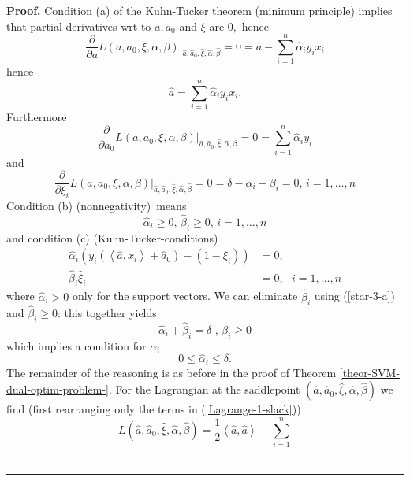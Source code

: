 \documentclass[11pt,twoside]{article}%
\theoremstyle{change}
\newenvironment{proof}[1][Proof]{\textbf{#1.} }{\ \rule{0.5em}{0.5em}}
\begin{document}
\begin{proof}
Condition (a) of the Kuhn-Tucker theorem (minimum principle) implies that
partial derivatives wrt to $a,a_{0}$ and $\xi$ are $0,$ hence%
\[
\frac{\partial}{\partial a}L\left(  a,a_{0},\xi,\alpha,\beta\right)
|_{\hat{a},\hat{a}_{0},\hat{\xi},\hat{\alpha},\hat{\beta}}=0=\hat{a}%
-\sum_{i=1}^{n}\hat{\alpha}_{i}y_{i}x_{i}%
\]
hence
\begin{equation}
\hat{a}=\sum_{i=1}^{n}\hat{\alpha}_{i}y_{i}x_{i}.\label{star-1-firstclaim-a}%
\end{equation}
Furthermore
\begin{equation}
\frac{\partial}{\partial a_{0}}L\left(  a,a_{0},\xi,\alpha,\beta\right)
|_{\hat{a},\hat{a}_{0},\hat{\xi},\hat{\alpha},\hat{\beta}}=0=\sum_{i=1}%
^{n}\hat{\alpha}_{i}y_{i}\label{star-2-a}%
\end{equation}
and
\begin{equation}
\frac{\partial}{\partial\xi_{i}}L\left(  a,a_{0},\xi,\alpha,\beta\right)
|_{\hat{a},\hat{a}_{0},\hat{\xi},\hat{\alpha},\hat{\beta}}=0=\delta-\alpha
_{i}-\beta_{i}=0\text{, }i=1,\ldots,n\label{star-3-a}%
\end{equation}
Condition (b) (nonnegativity)\ means
\[
\hat{\alpha}_{i}\geq0\text{, }\hat{\beta}_{i}\geq0\text{, }i=1,\ldots,n
\]
and condition (c) (Kuhn-Tucker-conditions)
\begin{align}
\hat{\alpha}_{i}\left(  y_{i}\left(  \left\langle \hat{a},x_{i}\right\rangle
+\hat{a}_{0}\right)  -\left(  1-\xi_{i}\right)  \right)   &
=0,\label{KT-slack-1}\\
\hat{\beta}_{i}\hat{\xi}_{i}  & =0,\text{ }i=1,\ldots,n\label{KT-slack-2}%
\end{align}
where $\hat{\alpha}_{i}>0$ only for the support vectors. We can eliminate
$\hat{\beta}_{i}$ using (\ref{star-3-a}) and $\hat{\beta}_{i}\geq0$: this
together yields
\begin{equation}
\hat{\alpha}_{i}+\hat{\beta}_{i}=\delta\text{ , }\beta_{i}\geq
0\label{add-alpha-beta}%
\end{equation}
which implies a condition for $\alpha_{i}$
\[
0\leq\hat{\alpha}_{i}\leq\delta\text{.}%
\]
The remainder of the reasoning is as before in the proof of Theorem
\ref{theor-SVM-dual-optim-problem-}. For the Lagrangian at the saddlepoint
$\left(  \hat{a},\hat{a}_{0},\hat{\xi},\hat{\alpha},\hat{\beta}\right)  $ we
find (first rearranging only the terms in (\ref{Lagrange-1-slack}))
\begin{equation}
L\left(  \hat{a},\hat{a}_{0},\hat{\xi},\hat{\alpha},\hat{\beta}\right)
=\frac{1}{2}\left\langle \hat{a},\hat{a}\right\rangle -\sum_{i=1}^{n}%

\end{equation}
\end{proof}
\end{document}
